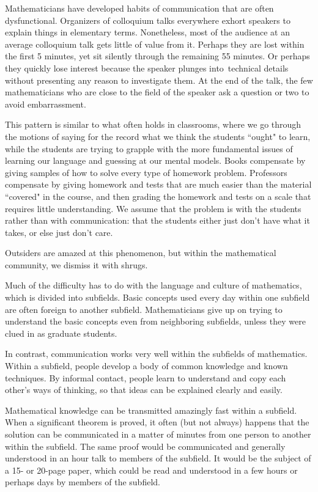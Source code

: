 Mathematicians have 
developed habits of communication that are often 
dysfunctional. Organizers
of colloquium talks everywhere exhort speakers to explain 
things in 
elementary terms.  Nonetheless, most of the audience at an 
average 
colloquium talk gets little of value from it.  
Perhaps they are lost within the first
5 minutes, yet sit silently through the remaining 55 
minutes. Or perhaps they
quickly lose interest because the speaker plunges
into\ technical details
without presenting any reason to investigate them.   
At the end of the talk, the few mathematicians who are 
close to the field
of the speaker ask a question or two to avoid 
embarrassment.  

This pattern is similar to what often holds in 
classrooms, where we go through the motions of 
saying for the record what we think the students ``ought" 
to learn,
while the students are trying to grapple with the more 
fundamental issues of
learning our language and guessing at our mental models.   
Books compensate
by giving samples of how to solve every type of homework 
problem.
Professors compensate by giving homework and tests that 
are much easier than
the material ``covered" in the course, and then grading 
the homework
and tests on a scale that requires little understanding.
We assume that the problem is with the students rather 
than with
communication: that the students either just don't have 
what it takes,
or else just don't care.

Outsiders are amazed at this phenomenon, but within the
mathematical community, we dismiss it with shrugs.

\smallskip

Much of the difficulty has to do with 
the language and culture of mathematics, which is divided 
into 
subfields.   Basic concepts used every day 
within one subfield are often foreign to another subfield.
Mathematicians give up on trying to understand the basic 
concepts even 
from neighboring subfields, unless they were clued in as 
graduate 
students.

In contrast, communication works very well within the 
subfields
of mathematics. Within a subfield, people develop a body
of common knowledge and known techniques.   By informal 
contact, people 
learn to understand and copy each other's ways of thinking,
so that ideas can be explained clearly and easily.

Mathematical
knowledge can be transmitted amazingly fast within a 
subfield.  When a 
significant theorem is proved, it often (but not always) 
happens that
the solution can be communicated in a matter of minutes 
from one person
to another within the subfield.  The same proof would be 
communicated and
generally understood in an hour talk to members of the 
subfield.   It
would be the subject of a 15- or 20-page paper, which 
could be read and
understood in a few hours or perhaps days by members of 
the subfield.

